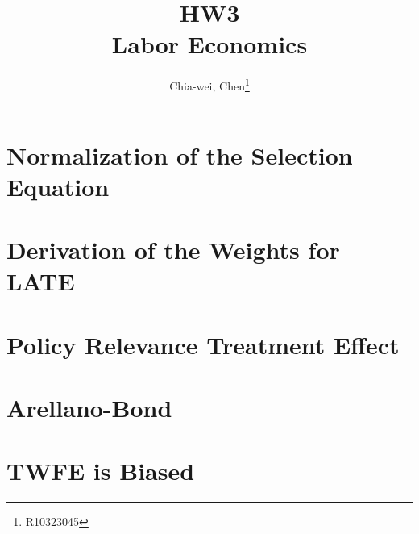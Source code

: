 \documentclass[12pt]{article}
\author{Chia-wei, Chen\thanks{R10323045}}
\title{HW3 \\ Labor Economics}
\begin{document}
    \maketitle
    \section{Normalization of the Selection Equation}
    

    \section{Derivation of the Weights for LATE}
    

    \section{Policy Relevance Treatment Effect}
    

    \section{Arellano-Bond}
    

    \section{TWFE is Biased}
    
\end{document}
